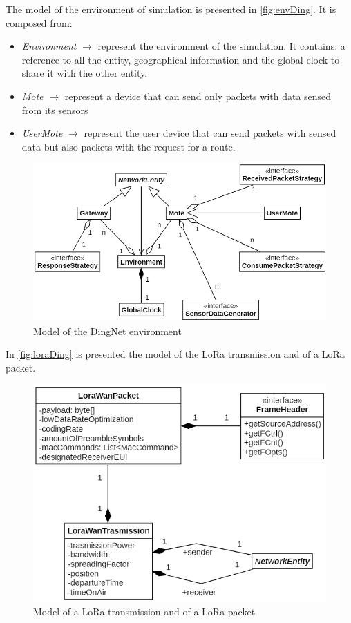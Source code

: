 The model of the environment of simulation is presented in \autoref{fig:envDing}. It is composed from:
\begin{itemize}
    \item \textit{Environment} $\rightarrow$ represent the environment of the simulation. It contains: a reference to all the entity, geographical information and the global clock to share it with the other entity.
    \item \textit{Mote} $\rightarrow$ represent a device that can send only packets with data sensed from its sensors
    \item \textit{UserMote} $\rightarrow$ represent the user device that can send packets with sensed data but also packets with the request for a route.
\end{itemize}
\begin{figure}[h]
    \centering
    \includegraphics[scale=0.9]{images/envDing.png}
    \caption{Model of the DingNet environment}
    \label{fig:envDing}
\end{figure}

In \autoref{fig:loraDing} is presented the model of the LoRa transmission and of a LoRa packet.

\begin{figure}[h]
    \centering
    \includegraphics[scale=0.9]{images/loraDing.png}
    \caption{Model of a LoRa transmission and of a LoRa packet}
    \label{fig:loraDing}
\end{figure}
